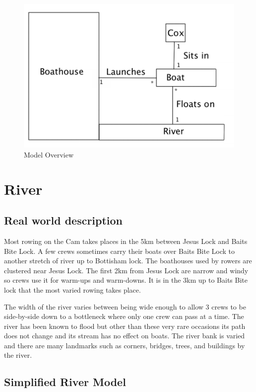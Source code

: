     \begin{figure}
    \begin{center}
    	\includegraphics[scale=0.55]{images/ModelOverview.png}
    	\caption{Model Overview}
    	\label{fig:modeloverview}
    \end{center}
    \end{figure}

    \section{River}
      \subsection{Real world description}
      Most rowing on the Cam takes places in the 5km between Jesus Lock and Baits Bite Lock. A few crews sometimes carry their boats over Baits Bite Lock to another stretch of river up to Bottisham lock. The boathouses used by rowers are clustered near Jesus Lock. The first 2km from Jesus Lock are narrow and windy so crews use it for warm-ups and warm-downs. It is in the 3km up to Baits Bite lock that the most varied rowing takes place. 
      
      The width of the river varies between being wide enough to allow 3 crews to be side-by-side down to a bottleneck where only one crew can pass at a time. The river has been known to flood but other than these very rare occasions its path does not change and its stream has no effect on boats. The river bank is varied and there are many landmarks such as corners, bridges, trees, and buildings by the river. 
      
      \subsection{Simplified River Model}
      
